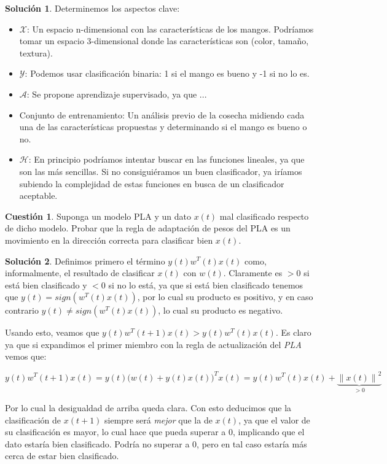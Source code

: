 \documentclass[a4paper, 11pt]{article}
\theoremstyle{definition}
\newtheorem{cuestion}{Cuestión}
\newtheorem*{solucion}{Solución}
\newcommand{\norm}[1]{\left\lVert#1\right\rVert}
\begin{document}
  \begin{solucion}
    Determinemos los aspectos clave:
    \begin{itemize}
      \item $\mathcal{X}$: Un espacio n-dimensional con las características de los mangos. Podríamos tomar un espacio 3-dimensional donde las características son (color, tamaño, textura).
      \item $\mathcal{Y}$: Podemos usar clasificación binaria: 1 si el mango es bueno y -1 si no lo es.
      \item $\mathcal{A}$: Se propone aprendizaje supervisado, ya que ...
      \item Conjunto de entrenamiento: Un análisis previo de la cosecha midiendo cada una de las características propuestas y determinando si el mango es bueno o no.
      \item $\mathcal{H}$: En principio podríamos intentar buscar en las funciones lineales, ya que son las más sencillas. Si no consiguiéramos un buen clasificador, ya iríamos subiendo la complejidad de estas funciones en busca de un clasificador aceptable.
    \end{itemize}
  \end{solucion}

  \begin{cuestion}
  Suponga un modelo PLA y un dato $x(t)$ mal clasificado respecto de dicho modelo. Probar que la regla de adaptación de pesos del PLA es un movimiento en la dirección correcta para clasificar bien $x(t)$.

  \end{cuestion}

  \begin{solucion}
    Definimos primero el término $y(t)w^T(t)x(t)$ como, informalmente,  el resultado de clasificar $x(t)$ con $w(t)$. Claramente es $>0$ si está bien clasificado y $<0$ si no lo está, ya que si está bien clasificado tenemos que $y(t) = sign(w^T(t)x(t))$, por lo cual su producto es positivo, y en caso contrario $y(t) \neq sign(w^T(t)x(t))$, lo cual su producto es negativo.

    Usando esto, veamos que $y(t)w^T(t+1)x(t) > y(t)w^T(t)x(t)$. Es claro ya que      si expandimos el primer miembro con la regla de actualización del \emph{PLA} vemos que:

    \[
    y(t)w^T(t+1)x(t) = y(t){\big( w(t)+y(t)x(t) \big)}^T x(t) = y(t)w^T(t)x(t) + \underbrace{{\norm{x(t)}}^2}_{>0}
    \]

    Por lo cual la desigualdad de arriba queda clara. Con esto deducimos que la clasificación de $x(t+1)$ siempre será \emph{mejor} que la de $x(t)$, ya que el valor de su clasificación es mayor, lo cual hace que pueda superar a $0$, implicando que el dato estaría bien clasificado. Podría no superar a $0$, pero en tal caso estaría más cerca de estar bien clasificado.
  \end{solucion}
\end{document}
